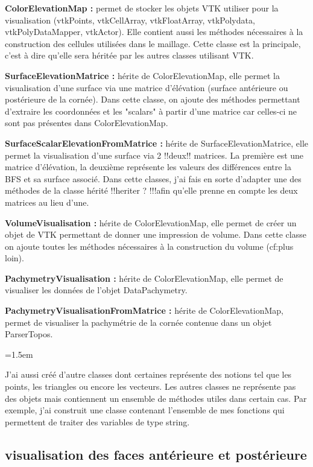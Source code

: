 \documentclass[a4paper,12pt]{article}
\begin{document}
\textbf{ColorElevationMap : }
permet de stocker les objets VTK utiliser pour la visualisation (vtkPoints, vtkCellArray, vtkFloatArray, vtkPolydata, vtkPolyDataMapper, vtkActor). Elle contient aussi les méthodes nécessaires à la construction des cellules utilisées dans le maillage. Cette classe est la principale, c'est à dire qu'elle sera héritée par les autres classes utilisant VTK.

\textbf{SurfaceElevationMatrice : }
hérite de ColorElevationMap, elle permet la visualisation d'une surface via une matrice d'élévation (surface antérieure ou postérieure de la cornée). Dans cette classe, on ajoute des méthodes permettant d'extraire les coordonnées et les "scalars" à partir d'une matrice car celles-ci ne sont pas présentes dans ColorElevationMap.

\textbf{SurfaceScalarElevationFromMatrice : }
hérite de SurfaceElevationMatrice, elle permet la visualisation d'une surface via 2 !!deux!! matrices. La première est une matrice d'élévation, la deuxième représente les valeurs des différences entre la BFS et sa surface associé. Dans cette classes, j'ai fais en sorte d'adapter une des méthodes de la classe hérité !!heriter ? !!!afin qu'elle prenne en compte les deux matrices au lieu d'une.

\textbf{VolumeVisualisation : }
hérite de ColorElevationMap, elle permet de créer un objet de VTK permettant de donner une impression de volume. Dans cette classe on ajoute toutes les méthodes nécessaires à la construction du volume (cf:plus loin).

\textbf{PachymetryVisualisation : }
hérite de ColorElevationMap, elle permet de visualiser les données de l'objet DataPachymetry.

\textbf{PachymetryVisualisationFromMatrice : }
hérite de ColorElevationMap, permet de visualiser la pachymétrie de la cornée contenue dans un objet ParserTopos.

\vspace{0.25cm}
\parindent=1.5em

 J'ai aussi créé d'autre classes dont certaines représente des notions tel que les points, les triangles ou encore les vecteurs. Les autres classes ne représente pas des objets mais contiennent un ensemble de méthodes utiles dans certain cas. Par exemple, j'ai construit une classe contenant l'ensemble de mes fonctions qui permettent de traiter des variables de type string.
	\subsection{visualisation des faces antérieure et postérieure}
	
\end{document}
